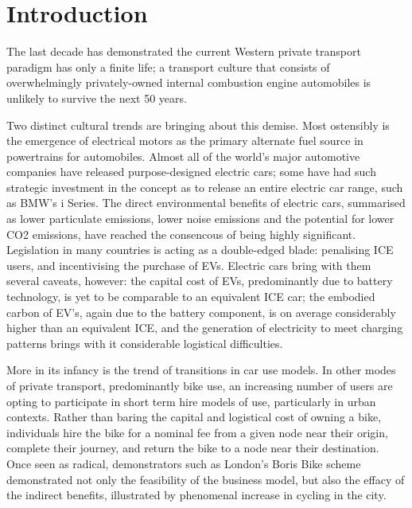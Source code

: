 \documentclass[conference]{IEEEtran}
\begin{document}

\section{Introduction}

The last decade has demonstrated the current Western private transport
paradigm has only a finite life; a transport culture that consists of
overwhelmingly privately-owned internal combustion engine automobiles
is unlikely to survive the next 50 years.

Two distinct cultural trends are bringing about this demise. Most
ostensibly is the emergence of electrical motors as the primary
alternate fuel source in powertrains for automobiles. Almost all of
the world’s major automotive companies have released purpose-designed
electric cars; some have had such strategic investment in the concept
as to release an entire electric car range, such as BMW's i
Series. The direct environmental benefits of electric cars, summarised
as lower particulate emissions, lower noise emissions and the
potential for lower CO2 emissions, have reached the consencous of
being highly significant. Legislation in many countries is acting as a
double-edged blade: penalising ICE users, and incentivising the
purchase of EVs. Electric cars bring with them several caveats,
however: the capital cost of EVs, predominantly due to battery
technology, is yet to be comparable to an equivalent ICE car; the
embodied carbon of EV's, again due to the battery component, is on
average considerably higher than an equivalent ICE, and the generation
of electricity to meet charging patterns brings with it considerable
logistical difficulties.

More in its infancy is the trend of transitions in car use models. In
other modes of private transport, predominantly bike use, an
increasing number of users are opting to participate in short term
hire models of use, particularly in urban contexts. Rather than baring
the capital and logistical cost of owning a bike, individuals hire the
bike for a nominal fee from a given node near their origin, complete
their journey, and return the bike to a node near their
destination. Once seen as radical, demonstrators such as London’s
Boris Bike scheme demonstrated not only the feasibility of the
business model, but also the effacy of the indirect benefits,
illustrated by phenomenal increase in cycling in the city. 
\end{document}
